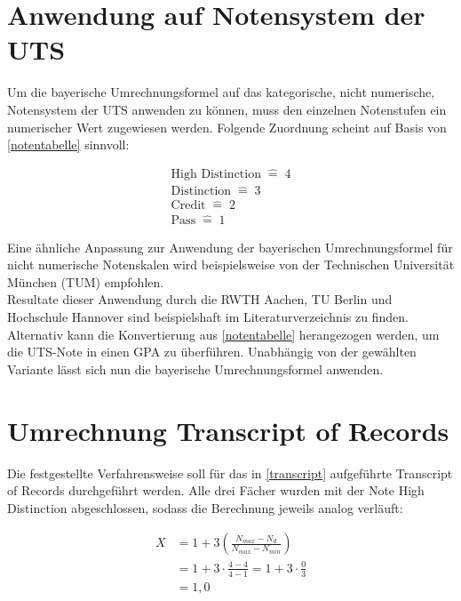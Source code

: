 \documentclass[12pt]{scrartcl}
\begin{document}
\section{Anwendung auf Notensystem der UTS}
Um die bayerische Umrechnungsformel auf das kategorische, nicht numerische, Notensystem der UTS anwenden zu können, muss den einzelnen Notenstufen ein numerischer Wert zugewiesen werden. Folgende Zuordnung scheint auf Basis von \autoref{notentabelle} sinnvoll:

\begin{gather*}
    \textrm{High Distinction} \; \widehat{=} \; 4\\
    \textrm{Distinction} \; \widehat{=} \; 3\\
    \textrm{Credit} \; \widehat{=} \; 2\\
    \textrm{Pass} \; \widehat{=} \; 1
\end{gather*}

Eine ähnliche Anpassung zur Anwendung der bayerischen Umrechnungsformel für nicht numerische Notenskalen wird beispielsweise von der Technischen Universität München (TUM) empfohlen. \cite{TUM}\\
Resultate dieser Anwendung durch die RWTH Aachen, TU Berlin und Hochschule Hannover sind beispielshaft im Literaturverzeichnis zu finden. \cite{RWTH}\cite{TUBerlin}\cite{HSH}\\
Alternativ kann die Konvertierung aus \autoref{notentabelle} herangezogen werden, um die UTS-Note in einen GPA zu überführen.
Unabhängig von der gewählten Variante lässt sich nun die bayerische Umrechnungsformel anwenden.
\newpage

\section{Umrechnung Transcript of Records}
Die festgestellte Verfahrensweise soll für das in \autoref{transcript} aufgeführte Transcript of Records durchgeführt werden. Alle drei Fächer wurden mit der Note High Distinction abgeschlossen, sodass die Berechnung jeweils analog verläuft:

\begin{align*}
    X &= 1 + 3 \left(\frac{N_{max}-N_d}{N_{max}-N_{min}}\right)\\
      &= 1 + 3 \cdot \frac{4-4}{4-1} = 1 + 3 \cdot \frac{0}{3}\\ 
      &= 1,0 
\end{align*}
\end{document}

